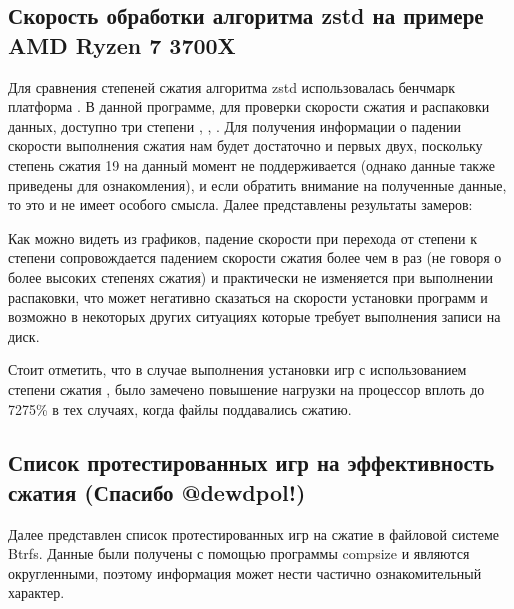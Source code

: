 \documentclass[letterpaper,10pt,russian,openany]{sphinxmanual}
\begin{document}
\subsection{Скорость обработки алгоритма zstd на примере AMD Ryzen 7 3700X}
\label{\detokenize{source/file-systems:zstd-amd-ryzen-7-3700x}}\label{\detokenize{source/file-systems:zstd-compression-test}}\label{\detokenize{source/file-systems:index-4}}
\sphinxAtStartPar
Для сравнения степеней сжатия алгоритма zstd использовалась бенчмарк платформа .
В данной программе, для проверки скорости сжатия и распаковки данных, доступно три степени \sphinxhyphen{} , , .
Для получения информации о падении скорости выполнения сжатия нам будет достаточно и первых двух, поскольку степень сжатия 19 на данный момент не поддерживается
(однако данные также приведены для ознакомления), и если обратить внимание на полученные данные, то это и не имеет особого смысла. Далее представлены результаты замеров:

\noindent{}

\noindent{}

\noindent{}

\sphinxAtStartPar
Как можно видеть из графиков, падение скорости при перехода от степени  к степени  сопровождается падением скорости сжатия более чем в  раз
(не говоря о более высоких степенях сжатия) и практически не изменяется при выполнении распаковки,
что может негативно сказаться на скорости установки программ и возможно в некоторых других ситуациях которые требует выполнения записи на диск.

\sphinxAtStartPar
Стоит отметить, что в случае выполнения установки игр с использованием степени сжатия ,
было замечено повышение нагрузки на процессор вплоть до 72\sphinxhyphen{}75\% в тех случаях, когда файлы поддавались сжатию.

\ignorespaces 

\subsection{Список протестированных игр на эффективность сжатия (Спасибо @dewdpol!)}
\label{\detokenize{source/file-systems:dewdpol}}\label{\detokenize{source/file-systems:comparison-table}}\label{\detokenize{source/file-systems:index-5}}
\sphinxAtStartPar
Далее представлен список протестированных игр на сжатие в файловой системе Btrfs.
Данные были получены с помощью программы compsize и являются округленными, поэтому информация может нести частично ознакомительный характер.
\end{document}
